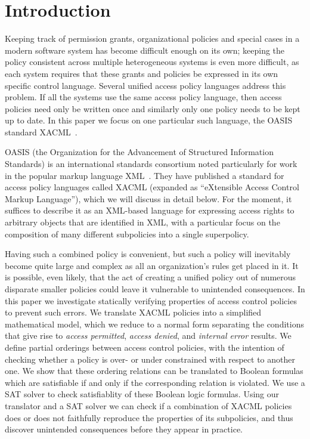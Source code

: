 \section{Introduction}

Keeping track of permission grants, organizational policies and
special cases in a modern software system has become difficult enough
on its own; keeping the policy consistent across multiple
heterogeneous systems is even more difficult, as each system requires
that these grants and policies be expressed in its own specific
control language.  Several unified access policy languages address
this problem.  If all the systems use the same access policy language,
then access policies need only be written once and similarly only one
policy needs to be kept up to date.  In this paper we focus on one
particular such language, the OASIS standard XACML~\cite{xacml}.

OASIS (the Organization for the Advancement of Structured Information
Standards) is an international standards consortium noted particularly
for work in the popular markup language XML~\cite{XML}.  They have
published a standard for access policy languages called XACML
(expanded as ``eXtensible Access Control Markup Language''), which we
will discuss in detail below.  For the moment, it suffices to describe
it as an XML-based language for expressing access rights to arbitrary
objects that are identified in XML, with a particular focus on the
composition of many different subpolicies into a single superpolicy.

Having such a combined policy is convenient, but such a policy will
inevitably become quite large and complex as all an organization's
rules get placed in it.  It is possible, even likely, that the act of
creating a unified policy out of numerous disparate smaller policies
could leave it vulnerable to unintended consequences.  In this paper
we investigate statically verifying properties of access control
policies to prevent such errors. We translate XACML policies into a
simplified mathematical model, which we reduce to a normal form
separating the conditions that give rise to {\em access permitted},
{\em access denied}, and {\em internal error} results. We define
partial orderings between access control policies, with the intention
of checking whether a policy is over- or under constrained with
respect to another one.  We show that these ordering relations can be
translated to Boolean formulas which are satisfiable if and only
if the corresponding relation is violated.  We use a SAT solver to check
satisfiablity of these Boolean logic formulas. Using our
translator and a SAT solver we can check if a combination of XACML
policies does or does not faithfully reproduce the properties of its
subpolicies, and thus discover unintended consequences before they
appear in practice.

